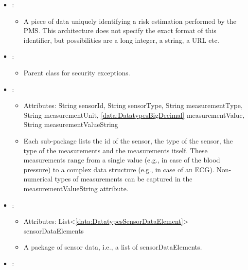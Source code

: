 \begin{itemize}[nolistsep,noitemsep]
\item {}: 
\begin{itemize}[noitemsep,nolistsep]

\item[] A piece of data uniquely identifying a risk estimation performed by the PMS. This architecture does not specify the exact format of this identifier,
but possibilities are a long integer, a string, a URL etc.
\end{itemize}

\item {}: 
\begin{itemize}[noitemsep,nolistsep]

\item[] Parent class for security exceptions.
\end{itemize}

\item {}: 
\begin{itemize}[noitemsep,nolistsep]
\item[] Attributes: String sensorId, String sensorType, String measurementType, String measurementUnit, \ref{data:DatatypesBigDecimal} measurementValue, String measurementValueString
\item[] Each sub-package lists the id of the sensor, the type of the sensor, the
type of the measurements and the measurements itself. These
measurements range from a single value (e.g., in case of the blood
pressure) to a complex data structure (e.g., in case of an ECG).
Non-numerical types of measurements can be captured in the measurementValueString attribute.
\end{itemize}

\item {}: 
\begin{itemize}[noitemsep,nolistsep]
\item[] Attributes: List\textless{}\ref{data:DatatypesSensorDataElement}\textgreater{} sensorDataElements
\item[] A package of sensor data, i.e., a list of sensorDataElements.

\end{itemize}

\item {}: 
\begin{itemize}


\end{itemize}
\end{itemize}
